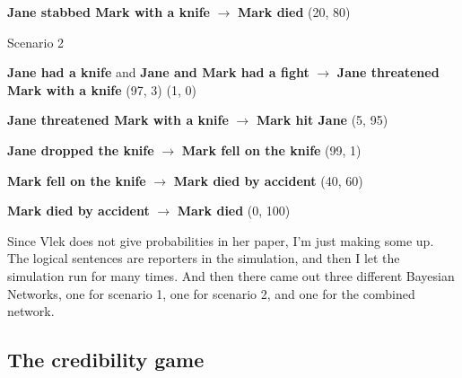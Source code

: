 \textbf{Jane stabbed Mark with a knife} $\rightarrow$ \textbf{Mark died} (20, 80)

Scenario 2

\textbf{Jane had a knife} and \textbf{Jane and Mark had a fight} $\rightarrow$ \textbf{Jane threatened Mark with a knife} (97, 3) (1, 0)

\textbf{Jane threatened Mark with a knife} $\rightarrow$  \textbf{Mark hit Jane} (5, 95)

\textbf{Jane dropped the knife} $\rightarrow$ \textbf{Mark fell on the knife} (99, 1)

\textbf{Mark fell on the knife} $\rightarrow$ \textbf{Mark died by accident} (40, 60)

 \textbf{Mark died by accident} $\rightarrow$  \textbf{Mark died}  (0, 100)


Since Vlek does not give probabilities in her paper, I'm just making some up. The logical sentences are reporters in the simulation, and then I let the simulation run for many times. And then there came out three different Bayesian Networks, one for scenario 1, one for scenario 2, and one for the combined network.




\subsection{The credibility game}

